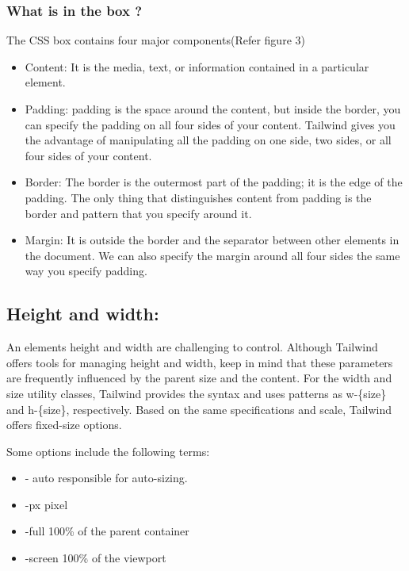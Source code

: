 \documentclass[conference]{IEEEtran}
\begin{document}
\subsubsection{\textbf{What is in the box ?}}

The CSS box contains four major components(Refer figure 3)

\begin{itemize}
\item Content: It is the media, text, or information contained in a
  particular element.
\item Padding: padding is the space around the content, but inside the  border, you can specify the padding on all four sides of your content. Tailwind gives you the advantage of manipulating all the padding on one side, two sides, or all four sides of your content.
\item Border: The border is the outermost part of the padding; it is the edge of the padding. The only thing that distinguishes content from padding is the border and pattern that you specify around it.
\item Margin: It is outside the border and the separator between other elements in the document. We can also specify the margin around all four sides the same way you specify padding.
\end{itemize}

\subsection{Height and width:}\label{height-and-width}

An element\textquotesingle s height and width are challenging to
control. Although Tailwind offers tools for managing height and width,
keep in mind that these parameters are frequently influenced by the
parent size and the content. For the width and size utility classes,
Tailwind provides the syntax and uses patterns as w-\{size\} and
h-\{size\}, respectively. Based on the same specifications and scale,
Tailwind offers fixed-size options.

Some options include the following terms:

\begin{itemize}
\item - auto responsible for auto-sizing.
\item-px pixel
\item -full 100\% of the parent container
\item -screen 100\% of the viewport
\end{itemize}
\end{document}
